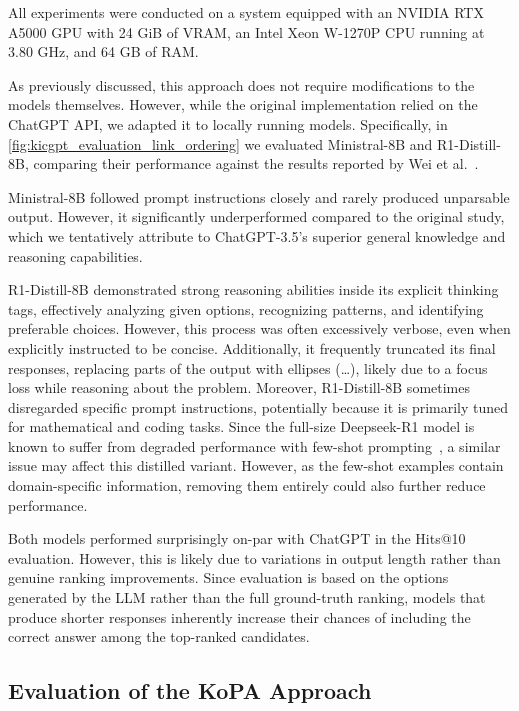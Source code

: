 \documentclass[12pt,a4paper]{article}
\newcommand{\modelministral}{Ministral-8B\xspace}
\newcommand{\modeldeepseek}{R1-Distill-8B\xspace}
\begin{document}
All experiments were conducted on a system equipped with an NVIDIA RTX A5000 GPU with 24 GiB of VRAM, an Intel Xeon W-1270P CPU running at 3.80 GHz, and 64 GB of RAM.

As previously discussed, this approach does not require modifications to the models themselves.
However, while the original implementation relied on the ChatGPT API, we adapted it to locally running models.
Specifically, in \cref{fig:kicgpt_evaluation_link_ordering} we evaluated \modelministral and \modeldeepseek, comparing their performance against the results reported by Wei et al.~\cite{wei2023kicgpt}.

\modelministral followed prompt instructions closely and rarely produced unparsable output.
However, it significantly underperformed compared to the original study,
which we tentatively attribute to ChatGPT-3.5’s superior general knowledge and reasoning capabilities.

\modeldeepseek demonstrated strong reasoning abilities inside its explicit thinking tags, effectively analyzing given options, recognizing patterns, and identifying preferable choices.
However, this process was often excessively verbose, even when explicitly instructed to be concise.
Additionally, it frequently truncated its final responses, replacing parts of the output with ellipses (\dots), likely due to a focus loss while reasoning about the problem.
Moreover, \modeldeepseek sometimes disregarded specific prompt instructions, potentially because it is primarily tuned for mathematical and coding tasks.
Since the full-size Deepseek-R1 model is known to suffer from degraded performance with few-shot prompting~\cite{guo2025deepseek}, a similar issue may affect this distilled variant.
However, as the few-shot examples contain domain-specific information, removing them entirely could also further reduce performance.

Both models performed surprisingly on-par with ChatGPT in the Hits@10 evaluation.
However, this is likely due to variations in output length rather than genuine ranking improvements.
Since evaluation is based on the options generated by the LLM rather than the full ground-truth ranking, models that produce shorter responses inherently increase their chances of including the correct answer among the top-ranked candidates.

\subsection{Evaluation of the KoPA Approach}
\end{document}
